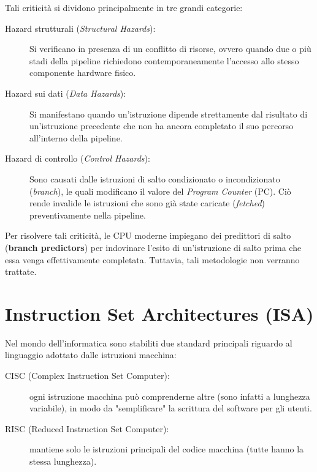 \documentclass[12pt]{report}
\begin{document}
	Tali criticità si dividono principalmente in tre grandi categorie:
	
	\begin{description}
		\item [Hazard strutturali (\textit{Structural Hazards}):] Si verificano in presenza di un conflitto di risorse, ovvero quando due o più stadi della pipeline richiedono contemporaneamente l'accesso allo stesso componente hardware fisico.
		
		\item [Hazard sui dati (\textit{Data Hazards}):] Si manifestano quando un'istruzione dipende strettamente dal risultato di un'istruzione precedente che non ha ancora completato il suo percorso all'interno della pipeline.
		
		\item [Hazard di controllo (\textit{Control Hazards}):] Sono causati dalle istruzioni di salto condizionato o incondizionato (\textit{branch}), le quali modificano il valore del \textit{Program Counter} (PC). Ciò rende invalide le istruzioni che sono già state caricate (\textit{fetched}) preventivamente nella pipeline.
		
	\end{description}
	
	Per risolvere tali criticità, le CPU moderne impiegano dei predittori di salto (\textbf{branch predictors}) per indovinare l'esito di un'istruzione di salto prima che essa venga effettivamente completata. Tuttavia, tali metodologie non verranno trattate.
	
	\section{Instruction Set Architectures (ISA)}
	\label{sec:instruction_set_architecture}
	
	Nel mondo dell'informatica sono stabiliti due standard principali riguardo al linguaggio adottato dalle istruzioni macchina:
	
	\begin{description}
		
		\item [CISC (Complex Instruction Set Computer):] ogni istruzione macchina può comprenderne altre (sono infatti a lunghezza variabile), in modo da "semplificare" la scrittura del software per gli utenti.
		
		\item [RISC (Reduced Instruction Set Computer):] mantiene solo le istruzioni principali del codice macchina (tutte hanno la stessa lunghezza).
		
	\end{description}
	
\end{document}
